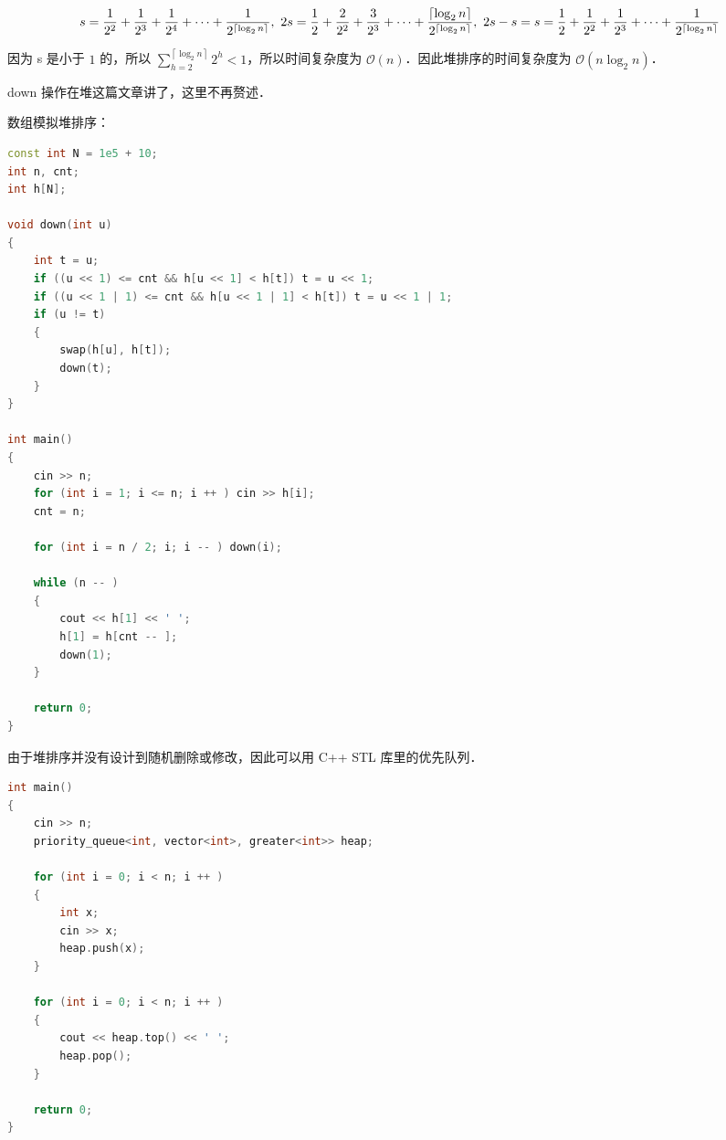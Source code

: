 \begin{equation}
s = \dfrac{1}{2^2} + \dfrac{1}{2^3} + \dfrac{1}{2^4} + \cdots +\dfrac{1}{2^{\left\lceil{\log_2 n}\right\rceil}} \\
, \ 2s = \dfrac{1}{2} + \dfrac{2}{2^2} + \dfrac{3}{2^3} + \cdots + \dfrac{\left\lceil{\log_2 n}\right\rceil}{2^{\left\lceil{\log_2 n}\right\rceil}} \\
, \ 2s - s = s= \dfrac{1}{2} + \dfrac{1}{2^2} + \dfrac{1}{2^3} + \cdots + \dfrac{1}{2^{\left\lceil{\log_2 n}\right\rceil}}
\end{equation}


因为 s 是小于 $1$ 的，所以 $\sum^{\left\lceil{\log_2 n}\right\rceil} _ {h = 2} 2^h < 1$，所以时间复杂度为 $\mathcal{O}(n)$．因此堆排序的时间复杂度为 $\mathcal{O}(n \log_2 n)$．

down 操作在堆这篇文章讲了，这里不再赘述．

数组模拟堆排序：
\begin{lstlisting}[language=cpp]
const int N = 1e5 + 10;
int n, cnt;
int h[N];

void down(int u)
{
    int t = u;
    if ((u << 1) <= cnt && h[u << 1] < h[t]) t = u << 1;
    if ((u << 1 | 1) <= cnt && h[u << 1 | 1] < h[t]) t = u << 1 | 1;
    if (u != t)
    {
        swap(h[u], h[t]);
        down(t);
    }
}

int main()
{
    cin >> n;
    for (int i = 1; i <= n; i ++ ) cin >> h[i];
    cnt = n;
    
    for (int i = n / 2; i; i -- ) down(i);
    
    while (n -- )
    {
        cout << h[1] << ' ';
        h[1] = h[cnt -- ];
        down(1);
    }
    
    return 0;
}
\end{lstlisting}

由于堆排序并没有设计到随机删除或修改，因此可以用 C++ STL 库里的优先队列．

\begin{lstlisting}[language=cpp]
int main()
{
    cin >> n;
    priority_queue<int, vector<int>, greater<int>> heap;
    
    for (int i = 0; i < n; i ++ )
    {
        int x;
        cin >> x;
        heap.push(x);
    }
    
    for (int i = 0; i < n; i ++ )
    {
        cout << heap.top() << ' ';
        heap.pop();
    }
    
    return 0;
}
\end{lstlisting}